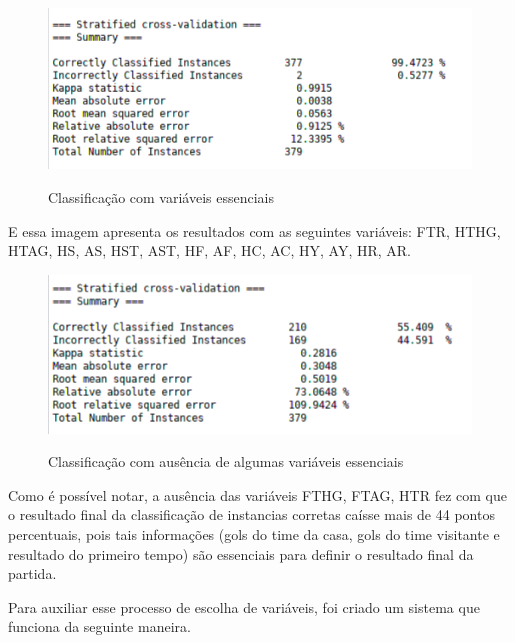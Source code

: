 \begin{figure}[htbp]
	\begin{center}
		\includegraphics[width=.9\linewidth]{imagens/dados_completos.png}\\
	\end{center}
	\caption[Classificação com variáveis essenciais]{Classificação com variáveis essenciais}
	\label{fig:logo}
\end{figure}

E essa imagem apresenta os resultados com as seguintes variáveis: FTR, HTHG, HTAG, HS, AS, HST, AST, HF, AF, HC, AC, HY, AY, HR, AR.

\newpage

\begin{figure}[htbp]
	\begin{center}
		\includegraphics[width=.9\linewidth]{imagens/dados_incompletos.png}\\
	\end{center}
	\caption[Classificação com ausência de algumas variáveis essenciais]{Classificação com ausência de algumas variáveis essenciais}
	\label{fig:logo}
\end{figure}


Como é possível notar, a ausência das variáveis FTHG, FTAG, HTR fez com que o resultado final da classificação de instancias corretas caísse mais de 44 pontos percentuais, pois tais informações (gols do time da casa, gols do time visitante e resultado do primeiro tempo) são essenciais para definir o resultado final da partida.

Para auxiliar esse processo de escolha de variáveis, foi criado um sistema que funciona da seguinte maneira.

